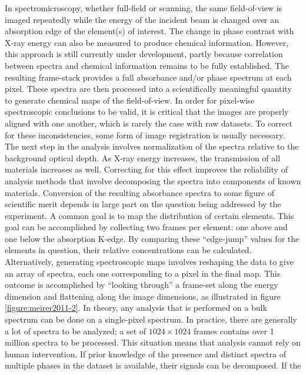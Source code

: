 \documentclass[journal=cmatex,manuscript=perspective]{achemso}
\begin{document}
In spectromicroscopy, whether full-field or scanning, the same
field-of-view is imaged repeatedly while the energy of the incident
beam is changed over an absorption edge of the element(s) of
interest. The change in phase contrast with X-ray energy can also be
measured to produce chemical information\cite{takahashi2011}. However,
this approach is still currently under development, partly because
correlation between spectra and chemical information remains to be
fully established. The resulting frame-stack provides a full
absorbance and/or phase spectrum at each pixel. These spectra are then
processed into a scientifically meaningful quantity to generate
chemical maps of the field-of-view. In order for pixel-wise
spectroscopic conclusions to be valid, it is critical that the images
are properly aligned with one another, which is rarely the case with
raw datasets. To correct for these inconsistencies, some form of image
registration is usually necessary. The next step in the analysis
involves normalization of the spectra relative to the background
optical depth. As X-ray energy increases, the transmission of all
materials increases as well. Correcting for this effect improves the
reliability of analysis methods that involve decomposing the spectra
into components of known materials\cite{jin2015}. Conversion of the
resulting absorbance spectra to some figure of scientific merit
depends in large part on the question being addressed by the
experiment. A common goal is to map the distribution of certain
elements. This goal can be accomplished by collecting two frames per
element: one above and one below the absorption K-edge. By comparing
these ``edge-jump'' values for the elements in question, their
relative concentrations can be
calculated\cite{shieh2006}. Alternatively, generating spectroscopic
maps involves reshaping the data to give an array of spectra, each one
corresponding to a pixel in the final map. This outcome is
accomplished by ``looking through'' a frame-set along the energy
dimension and flattening along the image dimensions, as illustrated in
figure \ref{figure:meirer2011-2}. In theory, any analysis that is
performed on a bulk spectrum can be done on a single-pixel
spectrum. In practice, there are generally a lot of spectra to be
analyzed; a set of $1024\times1024$ frames contains over 1 million
spectra to be processed. This situation means that analysis cannot
rely on human intervention. If prior knowledge of the presence and
distinct spectra of multiple phases in the dataset is available, their
signals can be decomposed\cite{wang2016,yu2015-2,shapiro2014}. If the
\end{document}
